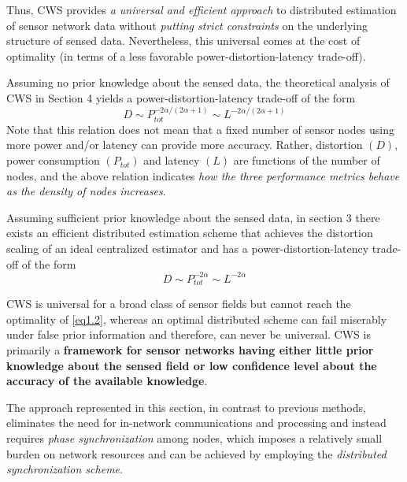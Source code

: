 Thus, CWS provides \emph{a universal and efficient approach} to distributed estimation of sensor network data without \emph{\textcolor[rgb]{0,0,1}{putting strict constraints}} on the underlying structure of sensed data. Nevertheless, this universal comes at the cost of optimality (in terms of a less favorable power-distortion-latency trade-off). 

Assuming no prior knowledge about the sensed data, the theoretical analysis of CWS in Section 4 yields a power-distortion-latency trade-off of the form
\begin{equation}
    D \sim P_{tot}^{-2 \alpha/(2\alpha + 1)} \sim L^{-2\alpha/(2\alpha + 1)}
    \label{eq1.1}
\end{equation}
Note that this relation does not mean that a fixed number of sensor nodes using more power and/or latency can provide more accuracy. Rather, distortion $(D)$, power consumption $(P_{tot})$ and latency $(L)$ are functions of the number of nodes, and the above relation indicates \emph{\textcolor[rgb]{1,0,0}{how the three performance metrics behave as the density of nodes increases}}.

Assuming sufficient prior knowledge about the sensed data, in section 3 there exists an efficient distributed estimation scheme that achieves the distortion scaling of an ideal centralized estimator and has a power-distortion-latency trade-off of the form
\begin{equation}
    D \sim P_{tot}^{-2\alpha} \sim L^{-2\alpha}
    \label{eq1.2}
\end{equation}

CWS is universal for a broad class of sensor fields but cannot reach the optimality of \cref{eq1.2}, whereas an optimal distributed scheme can fail miserably under false prior information and therefore, can never be universal. CWS is primarily a \textbf{\textcolor[rgb]{1,0,0}{framework for sensor networks having either little prior knowledge about the sensed field or low confidence level about the accuracy of the available knowledge}}.

The approach represented in this section, in contrast to previous methods, eliminates the need for in-network communications and processing and instead requires \emph{\textcolor[rgb]{1,0,0}{phase synchronization}} among nodes, which imposes a relatively small burden on network resources and can be achieved by employing the \emph{\textcolor[rgb]{1,0,0}{distributed synchronization scheme}}. 

